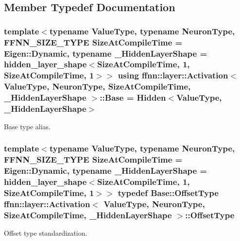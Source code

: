 \subsection{Member Typedef Documentation}
\hypertarget{classffnn_1_1layer_1_1_activation_a2f462178d98a5439e13962796c483459}{
\subsubsection[{Base}]{\setlength{\rightskip}{0pt plus 5cm}template$<$typename Value\-Type, typename Neuron\-Type, F\-F\-N\-N\-\_\-\-S\-I\-Z\-E\-\_\-\-T\-Y\-P\-E Size\-At\-Compile\-Time = Eigen\-::\-Dynamic, typename \-\_\-\-Hidden\-Layer\-Shape = hidden\-\_\-layer\-\_\-shape$<$\-Size\-At\-Compile\-Time, 1, Size\-At\-Compile\-Time, 1$>$$>$ using {\bf ffnn\-::layer\-::\-Activation}$<$ Value\-Type, Neuron\-Type, Size\-At\-Compile\-Time, \-\_\-\-Hidden\-Layer\-Shape $>$\-::{\bf Base} =  {\bf Hidden}$<$Value\-Type, \-\_\-\-Hidden\-Layer\-Shape$>$}}\label{classffnn_1_1layer_1_1_activation_a2f462178d98a5439e13962796c483459}


Base type alias. 

\hypertarget{classffnn_1_1layer_1_1_activation_aac891b2d2a76bcf6035f53ed6abb94dc}{
\subsubsection[{Offset\-Type}]{\setlength{\rightskip}{0pt plus 5cm}template$<$typename Value\-Type, typename Neuron\-Type, F\-F\-N\-N\-\_\-\-S\-I\-Z\-E\-\_\-\-T\-Y\-P\-E Size\-At\-Compile\-Time = Eigen\-::\-Dynamic, typename \-\_\-\-Hidden\-Layer\-Shape = hidden\-\_\-layer\-\_\-shape$<$\-Size\-At\-Compile\-Time, 1, Size\-At\-Compile\-Time, 1$>$$>$ typedef Base\-::\-Offset\-Type {\bf ffnn\-::layer\-::\-Activation}$<$ Value\-Type, Neuron\-Type, Size\-At\-Compile\-Time, \-\_\-\-Hidden\-Layer\-Shape $>$\-::{\bf Offset\-Type}}}\label{classffnn_1_1layer_1_1_activation_aac891b2d2a76bcf6035f53ed6abb94dc}


Offset type standardization. 

